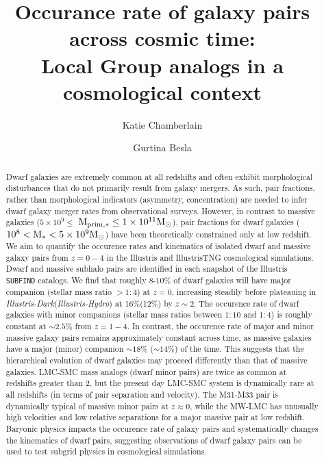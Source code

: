 \documentclass[twocolumn]{aastex63}
\newcommand\msun{\rm{M}_{\odot}}
\newcommand\ID{\textit{Illustris-Dark}}
\newcommand\IH{\textit{Illustris-Hydro}}
\begin{document}
\title{Occurance rate of galaxy pairs across cosmic time:\\ Local Group analogs in a cosmological context}

\author[0000-0001-8765-8670]{Katie Chamberlain}
\author{Gurtina Besla}
\begin{abstract}

  Dwarf galaxies are extremely common at all redshifts and often exhibit morphological disturbances that do not primarily result from galaxy mergers. As such, pair fractions, rather than morphological indicators (asymmetry, concentration) are needed to infer dwarf galaxy  merger rates from observational surveys.
  However, in contrast to massive galaxies ($5\times 10^9\leq$ $\rm M_{prim,*} \leq 1\times 10^{11} \msun$), pair fractions for dwarf galaxies ($10^8 < \rm M_* < 5 \times 10^9 \msun$) have been theoretically constrained only at low redshift.
  We aim to quantify the occurence rates and kinematics of isolated dwarf and massive galaxy pairs from $z=0-4$ in the Illustris and IllustrisTNG cosmological simulations.
  Dwarf and massive subhalo pairs are identified in each snapshot of the Illustris \texttt{SUBFIND} catalogs. 
  We find that roughly 8-10\% of dwarf galaxies will have major companion (stellar mass ratio $>1:4$) at $z=0$, increasing steadily before plateauing in \ID(\IH) at 16\%(12\%) by $z\sim 2$. The occurence rate of dwarf galaxies with minor companions (stellar mass ratios between $1:10$ and $1:4$) is roughly constant at $\sim 2.5\%$ from $z=1-4$. In contrast, the occurence rate of major and minor massive galaxy pairs remains approximately constant across time, as massive galaxies have a major (minor) companion $\sim18\%$ ($\sim14\%$) of the time.
  This suggests that the hierarchical evolution of dwarf galaxies may proceed differently than that of massive galaxies. LMC-SMC mass analogs (dwarf minor pairs) are twice as common at redshifts greater than 2, but the present day LMC-SMC system is dynamically rare at all redshifts (in terms of pair separation and velocity). The M31-M33 pair is dynamically typical of massive minor pairs at $z\approx0$, while the MW-LMC has unusually high velocities and low relative separations for a major massive pair at low redshift. Baryonic physics impacts the occurence rate of galaxy pairs and systematically changes the kinematics of dwarf pairs, suggesting observations of dwarf galaxy pairs can be used to test subgrid physics in cosmological simulations.

\end{abstract}
\end{document}
